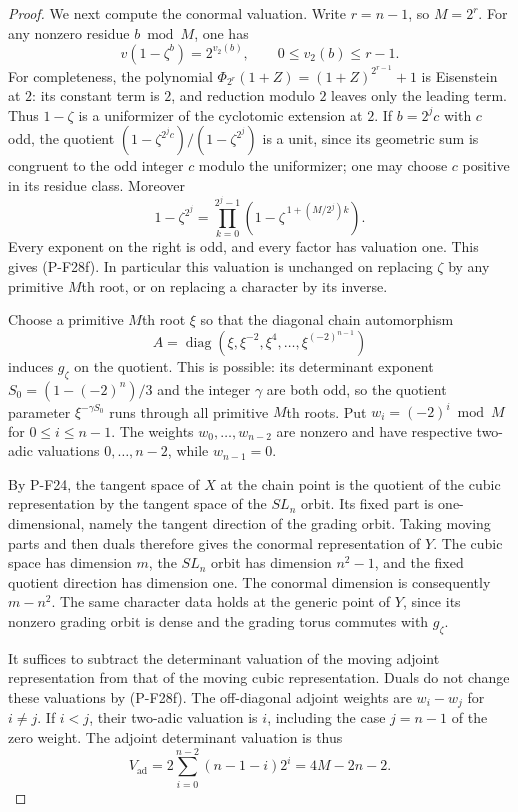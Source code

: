 \begin{proof}
We next compute the conormal valuation. Write
$r=n-1$, so $M=2^r$. For any nonzero residue
$b\bmod M$, one has
\[
 v(1-\zeta^b)=2^{v_2(b)},
 \qquad 0\le v_2(b)\le r-1.
 \tag{P-F28f}
\]
For completeness, the polynomial
$\Phi_{2^r}(1+Z)=(1+Z)^{2^{r-1}}+1$
is Eisenstein at $2$: its constant term is $2$,
and reduction modulo $2$ leaves only the leading
term. Thus $1-\zeta$ is a uniformizer of the
cyclotomic extension at $2$.
If $b=2^j c$ with $c$ odd, the quotient
$(1-\zeta^{2^j c})/(1-\zeta^{2^j})$ is a unit,
since its geometric sum is congruent to the odd
integer $c$ modulo the uniformizer; one may choose
$c$ positive in its residue class. Moreover
\[
 1-\zeta^{2^j}
   =\prod_{k=0}^{2^j-1}
       \left(1-\zeta^{\,1+(M/2^j)k}\right).
 \tag{P-F28g}
\]
Every exponent on the right is odd, and every factor
has valuation one. This gives (P-F28f).
In particular this valuation is unchanged on
replacing $\zeta$ by any primitive $M$th root,
or on replacing a character by its inverse.

Choose a primitive $M$th root $\xi$ so that the
diagonal chain automorphism
\[
 A=\operatorname{diag}
    (\xi,\xi^{-2},\xi^4,\ldots,\xi^{(-2)^{n-1}})
\]
induces $g_\zeta$ on the quotient. This is possible:
its determinant exponent
$S_0=(1-(-2)^n)/3$ and the integer $\gamma$ are
both odd, so the quotient parameter
$\xi^{-\gamma S_0}$ runs through all primitive
$M$th roots. Put $w_i=(-2)^i\bmod M$ for
$0\le i\le n-1$. The weights $w_0,\ldots,w_{n-2}$
are nonzero and have respective two-adic valuations
$0,\ldots,n-2$, while $w_{n-1}=0$.

By P-F24, the tangent space of $X$ at the chain point
is the quotient of the cubic representation by the
tangent space of the $SL_n$ orbit. Its fixed part is
one-dimensional, namely the tangent direction of
the grading orbit. Taking moving parts and then
duals therefore gives the conormal representation
of $Y$. The cubic space has dimension $m$, the
$SL_n$ orbit has dimension $n^2-1$, and the fixed
quotient direction has dimension one. The conormal
dimension is consequently $m-n^2$.
The same character data holds at the generic point
of $Y$, since its nonzero grading orbit is dense
and the grading torus commutes with $g_\zeta$.

It suffices to subtract the determinant valuation
of the moving adjoint representation from that
of the moving cubic representation. Duals do not
change these valuations by (P-F28f).
The off-diagonal adjoint weights are $w_i-w_j$
for $i\ne j$. If $i<j$, their two-adic valuation
is $i$, including the case $j=n-1$ of the zero
weight. The adjoint determinant valuation is thus
\[
 V_{\mathrm{ad}}
   =2\sum_{i=0}^{n-2}(n-1-i)2^i
   =4M-2n-2.
 \tag{P-F28h}
\]


\end{proof}
